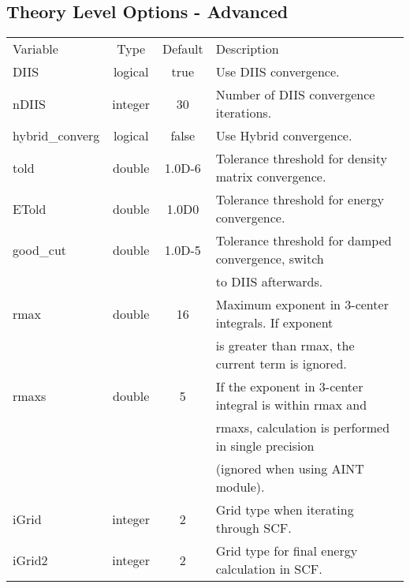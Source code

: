 \documentclass[journal=jctcce,manuscript=article]{achemso}
\begin{document}
    \subsection{Theory Level Options - Advanced}
    \begin{table}  [H]
      \begin{center}
      \begin{tabular}{ l c c l}
         Variable        & Type    & Default & Description \\
         DIIS            & logical & true    & Use DIIS convergence. \\
         nDIIS           & integer & 30      & Number of DIIS convergence iterations. \\
         hybrid\_converg & logical & false   & Use Hybrid convergence. \\
         told            & double  & 1.0D-6  & Tolerance threshold for density matrix convergence.\\
         ETold           & double  & 1.0D0   & Tolerance threshold for energy convergence.\\
         good\_cut       & double  & 1.0D-5  & Tolerance threshold for damped convergence, switch \\
         & &                                 & to DIIS afterwards.\\
         rmax            & double  & 16      & Maximum exponent in 3-center integrals. If exponent \\
         & &                                 & is greater than rmax, the current term is ignored.\\
         rmaxs           & double  & 5       & If the exponent in 3-center integral is within rmax and \\
         & &                                 & rmaxs, calculation is performed in single precision \\
         & &                                 & (ignored when using AINT module).\\
         iGrid           & integer & 2       & Grid type when iterating through SCF.\\
         iGrid2          & integer & 2       & Grid type for final energy calculation in SCF.\\         
       \end{tabular}
       \end{center}
      \label{lio.theorya.var}
    \end{table}    
    
\end{document}
